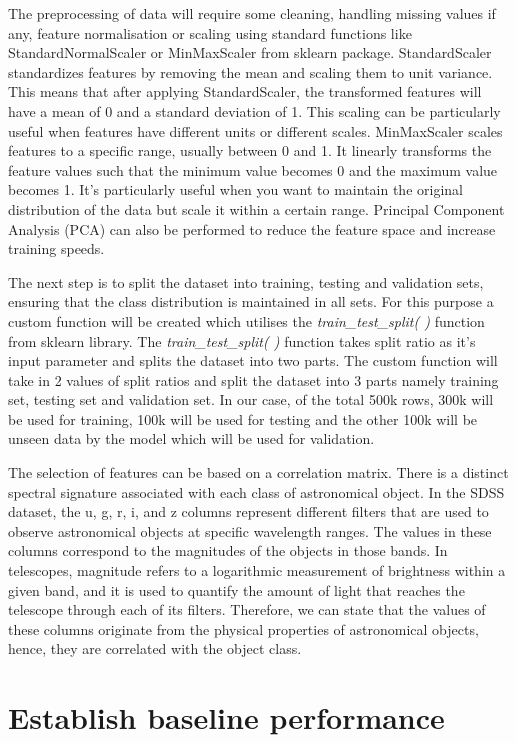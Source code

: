 The preprocessing of data will require some cleaning, handling missing values if any, feature normalisation or scaling using standard functions like StandardNormalScaler or MinMaxScaler from sklearn package. StandardScaler standardizes features by removing the mean and scaling them to unit variance. This means that after applying StandardScaler, the transformed features will have a mean of 0 and a standard deviation of 1. This scaling can be particularly useful when features have different units or different scales. MinMaxScaler scales features to a specific range, usually between 0 and 1. It linearly transforms the feature values such that the minimum value becomes 0 and the maximum value becomes 1. It's particularly useful when you want to maintain the original distribution of the data but scale it within a certain range. Principal Component Analysis (PCA) can also be performed to reduce the feature space and increase training speeds. 

The next step is to split the dataset into training, testing and validation sets, ensuring that the class distribution is maintained in all sets. For this purpose a custom function will be created which utilises the \textit{train\_test\_split( )} function from sklearn library. The \textit{train\_test\_split( )} function takes split ratio as it's input parameter and splits the dataset into two parts. The custom function will take in 2 values of split ratios and split the dataset into 3 parts namely training set, testing set and validation set. In our case, of the total 500k rows, 300k will be used for training, 100k will be used for testing and the other 100k will be unseen data by the model which will be used for validation.

The selection of features can be based on a correlation matrix. There is a distinct spectral signature associated with each class of astronomical object. In the SDSS dataset, the u, g, r, i, and z columns represent different filters that are used to observe astronomical objects at specific wavelength ranges. The values in these columns correspond to the magnitudes of the objects in those bands. In telescopes, magnitude refers to a logarithmic measurement of brightness within a given band, and it is used to quantify the amount of light that reaches the telescope through each of its filters. Therefore, we can state that the values of these columns originate from the physical properties of astronomical objects, hence, they are correlated with the object class.


\section{Establish baseline performance}

